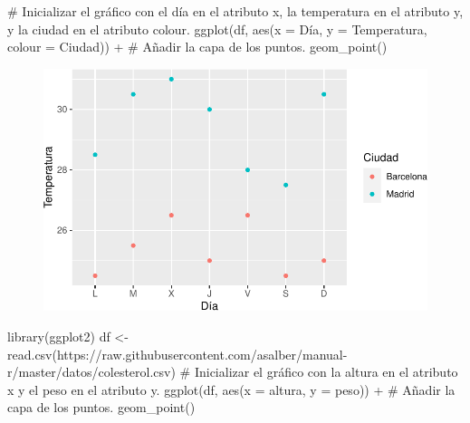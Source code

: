 \documentclass[
  a4paper,
]{scrreport}
\newenvironment{Shaded}{\begin{snugshade}}{\end{snugshade}}
\newcommand{\AttributeTok}[1]{\textcolor[rgb]{0.40,0.45,0.13}{#1}}
\newcommand{\CommentTok}[1]{\textcolor[rgb]{0.37,0.37,0.37}{#1}}
\newcommand{\FunctionTok}[1]{\textcolor[rgb]{0.28,0.35,0.67}{#1}}
\newcommand{\NormalTok}[1]{\textcolor[rgb]{0.00,0.23,0.31}{#1}}
\newcommand{\OtherTok}[1]{\textcolor[rgb]{0.00,0.23,0.31}{#1}}
\newcommand{\SpecialCharTok}[1]{\textcolor[rgb]{0.37,0.37,0.37}{#1}}
\newcommand{\StringTok}[1]{\textcolor[rgb]{0.13,0.47,0.30}{#1}}
\theoremstyle{definition}
\theoremstyle{definition}
\theoremstyle{remark}
\begin{document}
\begin{Shaded}
\begin{Highlighting}[]
\CommentTok{\# Inicializar el gráfico con el día en el atributo x, la temperatura en el atributo y, y la ciudad en el atributo colour.}
\FunctionTok{ggplot}\NormalTok{(df, }\FunctionTok{aes}\NormalTok{(}\AttributeTok{x =}\NormalTok{ Día, }\AttributeTok{y =}\NormalTok{ Temperatura, }\AttributeTok{colour =}\NormalTok{ Ciudad)) }\SpecialCharTok{+}
\CommentTok{\# Añadir la capa de los puntos.}
    \FunctionTok{geom\_point}\NormalTok{()}
\end{Highlighting}
\end{Shaded}

\begin{figure}[H]

{\centering \includegraphics{07-graficos_files/figure-pdf/unnamed-chunk-3-1.pdf}

}

\end{figure}

\begin{Shaded}
\begin{Highlighting}[]
\FunctionTok{library}\NormalTok{(ggplot2)}
\NormalTok{df }\OtherTok{\textless{}{-}} \FunctionTok{read.csv}\NormalTok{(}\StringTok{\textquotesingle{}https://raw.githubusercontent.com/asalber/manual{-}r/master/datos/colesterol.csv\textquotesingle{}}\NormalTok{)}
\CommentTok{\# Inicializar el gráfico con la altura en el atributo x y el peso en el atributo y.}
\FunctionTok{ggplot}\NormalTok{(df, }\FunctionTok{aes}\NormalTok{(}\AttributeTok{x =}\NormalTok{ altura, }\AttributeTok{y =}\NormalTok{ peso)) }\SpecialCharTok{+}
\CommentTok{\# Añadir la capa de los puntos.}
    \FunctionTok{geom\_point}\NormalTok{()}
\end{Highlighting}
\end{Shaded}
\end{document}
